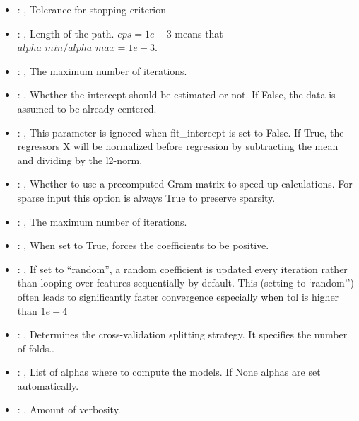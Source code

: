 \begin{itemize}
    \item {}: , 
      Tolerance for stopping criterion

    \item {}: , 
      Length of the path. $eps=1e-3$ means that
      $alpha\_min / alpha\_max = 1e-3$.

    \item {}: , 
      The maximum number of iterations.

    \item {}: , 
      Whether the intercept should be estimated or not. If False,
      the data is assumed to be already centered.

    \item {}: , 
      This parameter is ignored when fit\_intercept is set to False. If True,
      the regressors X will be normalized before regression by subtracting the mean and
      dividing by the l2-norm.

    \item {}: , 
      Whether to use a precomputed Gram matrix to speed up calculations.
      For sparse input this option is always True to preserve sparsity.

    \item {}: , 
      The maximum number of iterations.

    \item {}: , 
      When set to True, forces the coefficients to be positive.

    \item {}: , 
      If set to ``random'', a random coefficient is updated every iteration
      rather than looping over features sequentially by default. This (setting to `random'')
      often leads to significantly faster convergence especially when tol is higher than $1e-4$

    \item {}: , 
      Determines the cross-validation splitting strategy.
      It specifies the number of folds..

    \item {}: , 
      List of alphas where to compute the models. If None alphas
      are set automatically.

    \item {}: , 
      Amount of verbosity.
  \end{itemize}
